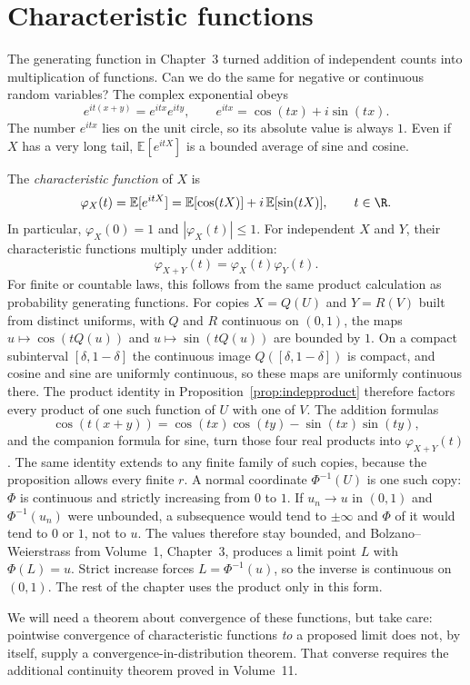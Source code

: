 \section{Characteristic functions}

The generating function in Chapter~3 turned addition of independent counts into multiplication of functions. Can we do the same for negative or continuous random variables? The complex exponential obeys
\[
 e^{it(x+y)}=e^{itx}e^{ity},\qquad
 e^{itx}=\cos(tx)+i\sin(tx).
\]
The number $e^{itx}$ lies on the unit circle, so its absolute value is always $1$. Even if $X$ has a very long tail, $\mathbb E[e^{itX}]$ is a bounded average of sine and cosine.

The \emph{characteristic function} of $X$ is\label{def:charfn}
\[
 \varphi_X(t)=\mathbb E[e^{itX}]
 =\mathbb E[\cos(tX)]+i\,\mathbb E[\sin(tX)],
 \qquad t\in\R.
\]
In particular, $\varphi_X(0)=1$ and $|\varphi_X(t)|\le1$. For independent $X$ and $Y$, their characteristic functions multiply under addition:
\[
 \varphi_{X+Y}(t)=\varphi_X(t)\varphi_Y(t).
\]
For finite or countable laws, this follows from the same product calculation as probability generating functions. For copies $X=Q(U)$ and $Y=R(V)$ built from distinct uniforms, with $Q$ and $R$ continuous on $(0,1)$, the maps $u\mapsto\cos(tQ(u))$ and $u\mapsto\sin(tQ(u))$ are bounded by $1$. On a compact subinterval $[\delta,1-\delta]$ the continuous image $Q([\delta,1-\delta])$ is compact, and cosine and sine are uniformly continuous, so these maps are uniformly continuous there. The product identity in Proposition~\ref{prop:indepproduct} therefore factors every product of one such function of $U$ with one of $V$. The addition formulas
\[
 \cos(t(x+y))=\cos(tx)\cos(ty)-\sin(tx)\sin(ty),
\]
and the companion formula for sine, turn those four real products into $\varphi_{X+Y}(t)$. The same identity extends to any finite family of such copies, because the proposition allows every finite $r$. A normal coordinate $\Phi^{-1}(U)$ is one such copy: $\Phi$ is continuous and strictly increasing from $0$ to $1$. If $u_n\to u$ in $(0,1)$ and $\Phi^{-1}(u_n)$ were unbounded, a subsequence would tend to $\pm\infty$ and $\Phi$ of it would tend to $0$ or $1$, not to $u$. The values therefore stay bounded, and Bolzano--Weierstrass from Volume~1, Chapter~3, produces a limit point $L$ with $\Phi(L)=u$. Strict increase forces $L=\Phi^{-1}(u)$, so the inverse is continuous on $(0,1)$. The rest of the chapter uses the product only in this form.

We will need a theorem about convergence of these functions, but take care: pointwise convergence of characteristic functions \emph{to} a proposed limit does not, by itself, supply a convergence-in-distribution theorem. That converse requires the additional continuity theorem proved in Volume~11.

